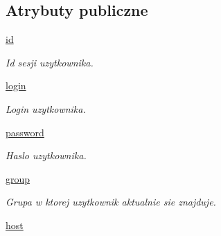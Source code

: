 \subsection*{Atrybuty publiczne}
\begin{DoxyCompactItemize}
\item 
\hypertarget{class_serv_1_1_user_1_1_user_a9ccda7549874ecd0e505e47ab9f7e2f7}{
\hyperlink{class_serv_1_1_user_1_1_user_a9ccda7549874ecd0e505e47ab9f7e2f7}{id}}
\label{class_serv_1_1_user_1_1_user_a9ccda7549874ecd0e505e47ab9f7e2f7}

\begin{DoxyCompactList}\small\item\em Id sesji uzytkownika. \item\end{DoxyCompactList}\item 
\hypertarget{class_serv_1_1_user_1_1_user_a26c268efd71044c8d201de3f2cc75ae1}{
\hyperlink{class_serv_1_1_user_1_1_user_a26c268efd71044c8d201de3f2cc75ae1}{login}}
\label{class_serv_1_1_user_1_1_user_a26c268efd71044c8d201de3f2cc75ae1}

\begin{DoxyCompactList}\small\item\em Login uzytkownika. \item\end{DoxyCompactList}\item 
\hypertarget{class_serv_1_1_user_1_1_user_aee1a7e306077b5c7b94746c088fd6807}{
\hyperlink{class_serv_1_1_user_1_1_user_aee1a7e306077b5c7b94746c088fd6807}{password}}
\label{class_serv_1_1_user_1_1_user_aee1a7e306077b5c7b94746c088fd6807}

\begin{DoxyCompactList}\small\item\em Haslo uzytkownika. \item\end{DoxyCompactList}\item 
\hypertarget{class_serv_1_1_user_1_1_user_a244ae8ec25ad4fd34379c275a3f71267}{
\hyperlink{class_serv_1_1_user_1_1_user_a244ae8ec25ad4fd34379c275a3f71267}{group}}
\label{class_serv_1_1_user_1_1_user_a244ae8ec25ad4fd34379c275a3f71267}

\begin{DoxyCompactList}\small\item\em Grupa w ktorej uzytkownik aktualnie sie znajduje. \item\end{DoxyCompactList}\item 
\hypertarget{class_serv_1_1_user_1_1_user_ab8dc612b892abb8d84cd2149cc3c5f3c}{
\hyperlink{class_serv_1_1_user_1_1_user_ab8dc612b892abb8d84cd2149cc3c5f3c}{host}}
\label{class_serv_1_1_user_1_1_user_ab8dc612b892abb8d84cd2149cc3c5f3c}


\end{DoxyCompactItemize}
